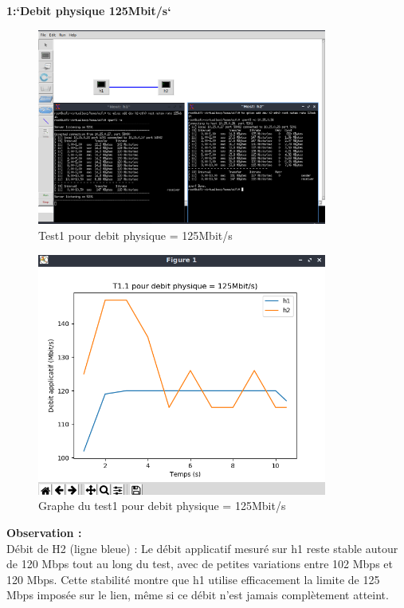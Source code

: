 \newpage
\textbf{1:`Debit physique 125Mbit/s`} 
\begin{figure}[H]
    \centering
    \includegraphics[width=0.85\textwidth]{./images/T1.1/125test1.png}
    \caption{Test1 pour debit physique = 125Mbit/s}
    \label{fig:exemple}
\end{figure}
\begin{figure}[H]
    \centering
    \includegraphics[width=0.85\textwidth]{./images/T1.1/courbe125test1.png} 
    \caption{Graphe du test1 pour debit physique = 125Mbit/s}
    \label{fig:exemple}
\end{figure}
\textbf{Observation :}\\
Débit de H2 (ligne bleue) : Le débit applicatif mesuré sur h1 reste stable autour de 120 Mbps tout au long du test, avec de petites variations entre 102 Mbps et 120 Mbps. Cette stabilité montre que h1 utilise efficacement la limite de 125 Mbps imposée sur le lien, même si ce débit n'est jamais complètement atteint.\\
